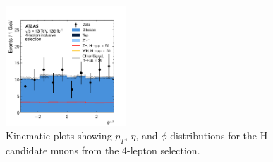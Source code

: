 \begin{figure}[htpb]
  \includegraphics[width=0.4\textwidth]{figures/hmm/kinematics/histo-4lep-u2_phi.pdf}
  \caption{Kinematic plots showing $p_T$, $\eta$, and $\phi$ distributions for the H candidate muons from the 4-lepton selection.}
    \label{fig:hmmKineZhMuons}
\end{figure}

